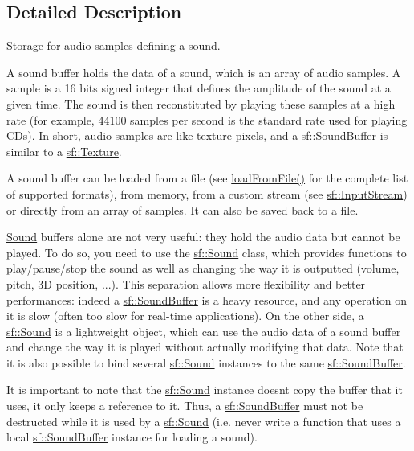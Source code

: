 \subsection{Detailed Description}
Storage for audio samples defining a sound. 

\begin{DoxyVerb}\end{DoxyVerb}


A sound buffer holds the data of a sound, which is an array of audio samples. A sample is a 16 bits signed integer that defines the amplitude of the sound at a given time. The sound is then reconstituted by playing these samples at a high rate (for example, 44100 samples per second is the standard rate used for playing C\+Ds). In short, audio samples are like texture pixels, and a \mbox{\hyperlink{classsf_1_1_sound_buffer}{sf\+::\+Sound\+Buffer}} is similar to a \mbox{\hyperlink{classsf_1_1_texture}{sf\+::\+Texture}}.

A sound buffer can be loaded from a file (see \mbox{\hyperlink{classsf_1_1_sound_buffer_a2be6a8025c97eb622a7dff6cf2594394}{load\+From\+File()}} for the complete list of supported formats), from memory, from a custom stream (see \mbox{\hyperlink{classsf_1_1_input_stream}{sf\+::\+Input\+Stream}}) or directly from an array of samples. It can also be saved back to a file.

\mbox{\hyperlink{classsf_1_1_sound}{Sound}} buffers alone are not very useful\+: they hold the audio data but cannot be played. To do so, you need to use the \mbox{\hyperlink{classsf_1_1_sound}{sf\+::\+Sound}} class, which provides functions to play/pause/stop the sound as well as changing the way it is outputted (volume, pitch, 3D position, ...). This separation allows more flexibility and better performances\+: indeed a \mbox{\hyperlink{classsf_1_1_sound_buffer}{sf\+::\+Sound\+Buffer}} is a heavy resource, and any operation on it is slow (often too slow for real-\/time applications). On the other side, a \mbox{\hyperlink{classsf_1_1_sound}{sf\+::\+Sound}} is a lightweight object, which can use the audio data of a sound buffer and change the way it is played without actually modifying that data. Note that it is also possible to bind several \mbox{\hyperlink{classsf_1_1_sound}{sf\+::\+Sound}} instances to the same \mbox{\hyperlink{classsf_1_1_sound_buffer}{sf\+::\+Sound\+Buffer}}.

It is important to note that the \mbox{\hyperlink{classsf_1_1_sound}{sf\+::\+Sound}} instance doesn\textquotesingle{}t copy the buffer that it uses, it only keeps a reference to it. Thus, a \mbox{\hyperlink{classsf_1_1_sound_buffer}{sf\+::\+Sound\+Buffer}} must not be destructed while it is used by a \mbox{\hyperlink{classsf_1_1_sound}{sf\+::\+Sound}} (i.\+e. never write a function that uses a local \mbox{\hyperlink{classsf_1_1_sound_buffer}{sf\+::\+Sound\+Buffer}} instance for loading a sound).

